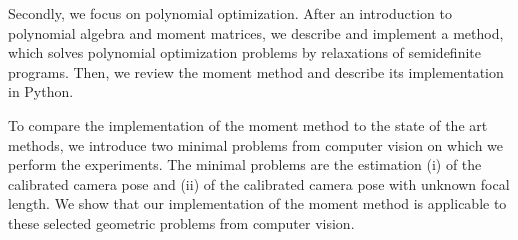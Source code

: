 Secondly, we focus on polynomial optimization.
After an introduction to polynomial algebra and moment matrices, we describe and implement a method, which solves polynomial optimization problems by relaxations of semidefinite programs.
Then, we review the moment method and describe its implementation in Python.

To compare the implementation of the moment method to the state of the art methods, we introduce two minimal problems from computer vision on which we perform the experiments.
The minimal problems are the estimation (i) of the calibrated camera pose and (ii) of the calibrated camera pose with unknown focal length.
We show that our implementation of the moment method is applicable to these selected geometric problems from computer vision.
